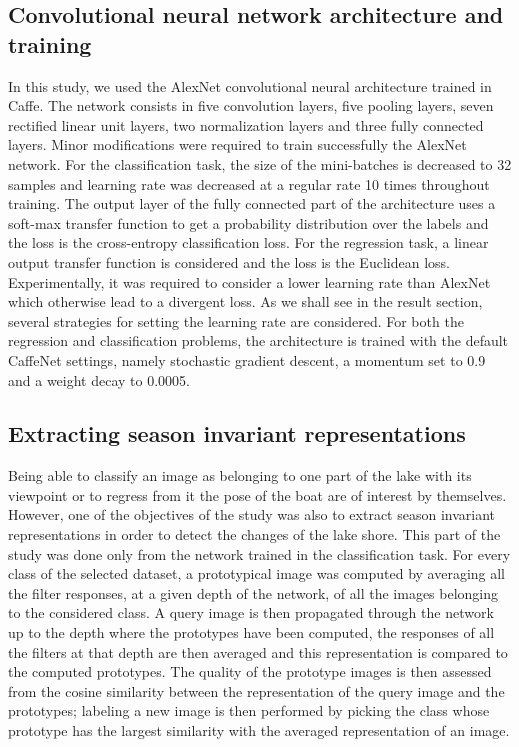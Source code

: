 \subsection{Convolutional neural network architecture and training}

In this study, we used the AlexNet convolutional neural architecture\cite{NIPS2012_4824} trained in Caffe\cite{jia2014caffe}. The network consists in five convolution layers, five pooling layers, seven rectified linear unit layers, two normalization layers and three fully connected layers. Minor modifications were required to train successfully the AlexNet network. For the classification task, the size of the mini-batches is decreased to 32 samples and learning rate was decreased at a regular rate 10 times throughout training. The output layer of the fully connected part of the architecture uses a soft-max transfer function to get a probability distribution over the labels and the loss is the cross-entropy classification loss. For the regression task, a linear output transfer function is considered and the loss is the Euclidean loss. Experimentally, it was required to consider a lower learning rate than AlexNet which otherwise lead to a divergent loss. As we shall see in the result section, several strategies for setting the learning rate are considered. For both the regression and classification problems, the architecture is trained with the default CaffeNet settings, namely stochastic gradient descent, a momentum set to 0.9 and a weight decay to 0.0005.


\subsection{Extracting season invariant representations}

Being able to classify an image as belonging to one part of the lake with its viewpoint or to regress from it the pose of the boat are of interest by themselves. However, one of the objectives of the study was also to extract season invariant representations in order to detect the changes of the lake shore. This part of the study was done only from the network trained in the classification task. For every class of the selected dataset, a prototypical image was computed by averaging all the filter responses, at a given depth of the network, of all the images belonging to the considered class. A query image is then propagated through the network up to the depth where the prototypes have been computed, the responses of all the filters at that depth are then averaged and this representation is compared to the computed prototypes. The quality of the prototype images is then assessed from the cosine similarity between the representation of the query image and the prototypes; labeling a new image is then performed by picking the class whose prototype has the largest similarity with the averaged representation of an image.
